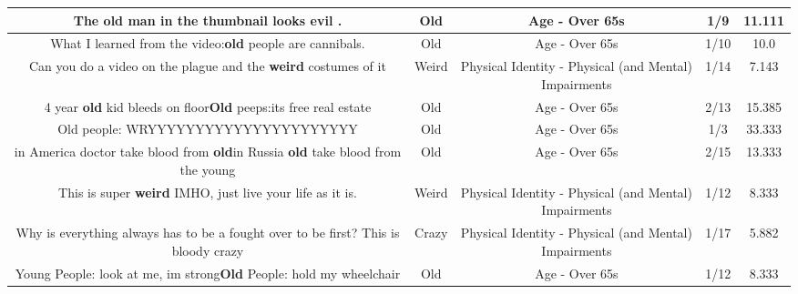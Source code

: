 \documentclass[11pt]{article}
\newlength\mylength
\begin{document}
\begin{center}
\begin{longtable}{|C{.65\mylength}|C{.30\mylength}|C{.12\mylength}|C{.12\mylength}|C{.12\mylength}|}
  \small The \textbf{old} man in the thumbnail looks evil .\normalsize   & Old & Age - Over 65s & 1/9 & 11.111 \\  \hline
  \small What I learned from the video:\textbf{old} people are cannibals.\normalsize   & Old & Age - Over 65s & 1/10 & 10.0 \\  \hline
  \small Can you do a video on the plague and the \textbf{weird} costumes of it\normalsize   & Weird & Physical Identity - Physical (and Mental) Impairments & 1/14 & 7.143 \\  \hline
  \small 4 year \textbf{old} kid bleeds on floor\textbf{Old} peeps:its free real estate\normalsize   & Old & Age - Over 65s & 2/13 & 15.385 \\  \hline
  \small Old people: WRYYYYYYYYYYYYYYYYYYYYYY\normalsize   & Old & Age - Over 65s & 1/3 & 33.333 \\  \hline
  \small in America doctor take blood from \textbf{old}in Russia \textbf{old} take blood from the young\normalsize   & Old & Age - Over 65s & 2/15 & 13.333 \\  \hline
  \small This is super \textbf{weird} IMHO, just live your life as it is.\normalsize   & Weird & Physical Identity - Physical (and Mental) Impairments & 1/12 & 8.333 \\  \hline
  \small Why is everything always has to be a fought over to be first? This is bloody crazy\normalsize   & Crazy & Physical Identity - Physical (and Mental) Impairments & 1/17 & 5.882 \\  \hline
  \small Young People: look at me, im strong\textbf{Old} People: hold my wheelchair\normalsize   & Old & Age - Over 65s & 1/12 & 8.333 \\  \hline

\end{longtable}
\end{center}
\end{document}
